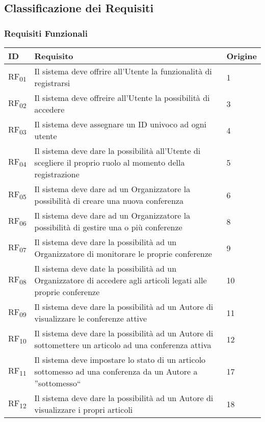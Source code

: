 \subsection{Classificazione dei Requisiti}
\label{sec:classificazione_requisiti}
\subsubsection{Requisiti Funzionali}
\label{sec:requisiti_funzionali}
\begin{tabular}{|p{1cm}|p{9cm}|p{1cm}|}
  \hline
  \rowcolor{SkyBlue}
  ID & Requisito & Origine \\
  \hline \hline
  RF\textsubscript{01} & Il sistema deve offrire all'Utente la funzionalità di registrarsi & 1\\
  \hline
  RF\textsubscript{02} & Il sistema deve offreire all'Utente la possibilità di accedere & 3\\
  \hline
  RF\textsubscript{03} & Il sistema deve assegnare un ID univoco ad ogni utente & 4\\
  \hline
  RF\textsubscript{04} & Il sistema deve dare la possibilità all'Utente di scegliere il proprio ruolo al momento della registrazione & 5 \\
  \hline
  RF\textsubscript{05} & Il sistema deve dare ad un Organizzatore la possibilità di creare una nuova conferenza& 6\\
  \hline
  RF\textsubscript{06} & Il sistema deve dare ad un Organizzatore la possibilità di gestire una o più conferenze & 8\\
  \hline
  RF\textsubscript{07} & Il sistema deve dare la possibilità ad un Organizzatore di monitorare le proprie conferenze & 9 \\
  \hline
  RF\textsubscript{08} & Il sistema deve date la possibilità ad un Organizzatore di accedere agli articoli legati alle proprie conferenze & 10 \\
  \hline
  RF\textsubscript{09} & Il sistema deve dare la possibilità ad un Autore di visualizzare le conferenze attive & 11 \\
  \hline
  RF\textsubscript{10} & Il sistema deve dare la possibilità ad un Autore di sottomettere un articolo ad una conferenza attiva & 12 \\
  \hline
  RF\textsubscript{11} & Il sistema deve impostare lo stato di un articolo sottomesso ad una conferenza da un Autore a ''sottomesso`` & 17 \\
  \hline
  RF\textsubscript{12} & Il sistema deve dare la possibilità ad un Autore di visualizzare i propri articoli & 18 \\

\end{tabular}
